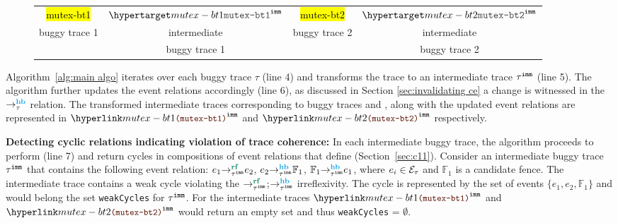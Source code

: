 \begin{figure}[!h]
	\begin{tabular}{|c|c|c|c|}
		\hline
		\resizebox{0.24\textwidth}{!}{} &
		\resizebox{0.24\textwidth}{!}{} &
		\resizebox{0.24\textwidth}{!}{} &
		\resizebox{0.24\textwidth}{!}{} \\
		\hline
		
		\multicolumn{1}{c}{\hl{mutex-bt1}} &
		\multicolumn{1}{c}{$\imm{\hl{mutex-bt1}}$}  &
		\multicolumn{1}{c}{\hl{mutex-bt2}} &
		\multicolumn{1}{c}{$\imm{\hl{mutex-bt2}}$} \\
		
		\multicolumn{1}{c}{buggy trace 1} &
		\multicolumn{1}{c}{intermediate} &
		\multicolumn{1}{c}{buggy trace 2} &
		\multicolumn{1}{c}{intermediate} \\
	
		\multicolumn{1}{c}{} &
		\multicolumn{1}{c}{buggy trace 1} &
		\multicolumn{1}{c}{} &
		\multicolumn{1}{c}{buggy trace 2} \\
	\end{tabular}
\end{figure}

Algorithm~\ref{alg:main algo} iterates over each buggy trace
$\tau$ (line 4) and transforms the trace to an intermediate 
trace ${\tau}^{\mathtt{imm}}$ (line 5). The algorithm further updates the 
event relations accordingly (line 6), as discussed in Section
\ref{sec:invalidating ce} a change is witnessed in the 
$\setHB$ relation. The transformed intermediate traces 
corresponding to buggy traces  and 
, along with the updated event relations are 
represented in $\imm{\hlref{mutex-bt1}}$ and 
$\imm{\hlref{mutex-bt2}}$ respectively.

\noindent
{\bf Detecting cyclic relations indicating violation of 
	trace coherence:}
In each intermediate buggy trace, the algorithm proceeds 
to perform \wkfence (line 7) and return cycles in compositions 
of event relations that define  
(Section~\ref{sec:c11}). 
%
Consider an intermediate buggy trace ${\tau}^{\mathtt{imm}}$ that 
contains the following event relation: 
$\rf{\imm{\tau}}{e_1}{e_2}$, $\hb{\imm{\tau}}{e_2}{\mathbb{F}_1}$,
$\hb{\imm{\tau}}{\mathbb{F}_1}{e_1}$, where $e_i \in 
\mathcal{E}_\tau$ and $\mathbb{F}_1$ is a candidate fence.
The intermediate trace contains a weak cycle violating
the $\rf{\imm{\tau}}{}{}$;$\hb{\imm{\tau}}{}{}$ 
irreflexivity. The cycle is represented by the set of events
$\{e_1, e_2, \mathbb{F}_1\}$ and would belong the set
{\tt weakCycles} for ${\tau}^{\mathtt{imm}}$.
%
For the intermediate traces 
$\imm{\hlref{mutex-bt1}}$ and $\imm{\hlref{mutex-bt2}}$
\wkfence would return an empty set and thus 
{\tt weakCycles} = $\emptyset$.

